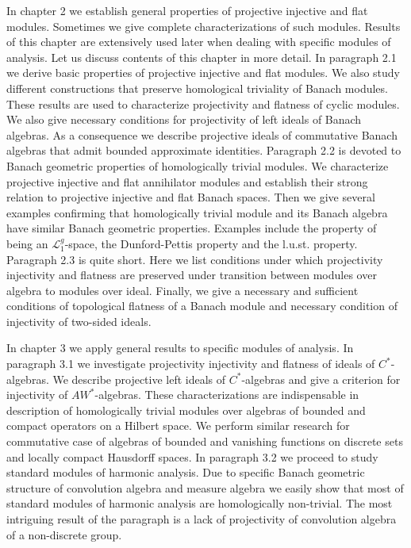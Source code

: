 \documentclass[11pt, a4paper, oneside]{thbook}
\begin{document}
In chapter 2 we establish general properties of projective injective and flat
modules. Sometimes we give complete characterizations of such modules.
Results of this chapter are extensively used later when dealing with
specific modules of analysis. Let us discuss contents of this chapter in more
detail. In paragraph 2.1 we derive basic properties of projective injective and
flat modules. We also study different
constructions that preserve homological triviality of Banach modules. These
results are used to characterize projectivity and flatness of cyclic modules. We
also give necessary conditions for projectivity of left ideals of Banach
algebras. As a consequence we describe projective ideals of commutative Banach
algebras that admit bounded approximate identities. Paragraph 2.2 is devoted to
Banach geometric properties of homologically trivial modules. We characterize
projective injective and flat annihilator modules and establish their strong
relation to projective injective and flat Banach spaces. Then we give several
examples confirming that homologically trivial module and its Banach algebra
have similar Banach geometric properties. Examples include the property of being
an $\mathscr{L}_1^g$-space, the Dunford-Pettis property and the l.u.st.
property. Paragraph 2.3 is quite short. Here we list conditions under which
projectivity injectivity and flatness are preserved under transition between
modules over algebra to modules over ideal. Finally, we give a necessary and
sufficient conditions of topological flatness of a Banach module and necessary
condition of injectivity of two-sided ideals.

In chapter 3 we apply general results to specific modules of analysis. In
paragraph 3.1 we investigate projectivity injectivity and flatness of ideals of
$C^*$-algebras. We describe projective left ideals of $C^*$-algebras and give a
criterion for injectivity of $AW^*$-algebras. These characterizations are
indispensable in description of homologically trivial modules over algebras of
bounded and compact operators on a Hilbert space. We perform similar research
for commutative case of algebras of bounded and vanishing functions on discrete
sets and locally compact Hausdorff spaces. In paragraph 3.2 we proceed to study 
standard modules of harmonic analysis. Due to specific Banach geometric
structure of convolution algebra and measure algebra we easily show that most of
standard modules of harmonic analysis are homologically non-trivial. The most
intriguing result of the paragraph is a lack of projectivity of convolution algebra 
of a non-discrete group. 
\end{document}
